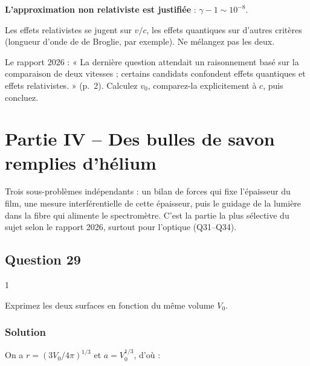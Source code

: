 \documentclass[11pt,a4paper]{article}
\begin{document}
\textbf{L'approximation non relativiste est justifiée} : \(\gamma-1\sim10^{-8}\).

\begin{piege}

Les effets relativistes se jugent sur \(v/c\), les effets quantiques sur d'autres critères (longueur d'onde de de Broglie, par exemple). Ne mélangez pas les deux.

\end{piege}

\begin{jury}

Le rapport 2026 : « La dernière question attendait un raisonnement basé sur la comparaison de deux vitesses ; certains candidats confondent effets quantiques et effets relativistes. » (p.~2). Calculez \(v_0\), comparez-la explicitement à \(c\), puis concluez.

\end{jury}

\hypertarget{partie-iv-des-bulles-de-savon-remplies-dhuxe9lium}{%
\section{Partie IV -- Des bulles de savon remplies d'hélium}\label{partie-iv-des-bulles-de-savon-remplies-dhuxe9lium}}

Trois sous-problèmes indépendants : un bilan de forces qui fixe l'épaisseur du film, une mesure interférentielle de cette épaisseur, puis le guidage de la lumière dans la fibre qui alimente le spectromètre. C'est la partie la plus sélective du sujet selon le rapport 2026, surtout pour l'optique (Q31--Q34).

\hypertarget{question-29}{%
\subsection{Question 29}\label{question-29}}

\begin{indication}{1}

Exprimez les deux surfaces en fonction du même volume \(V_0\).

\end{indication}

\hypertarget{solution-28}{%
\subsubsection{Solution}\label{solution-28}}

On a \(r=(3V_0/4\pi)^{1/3}\) et \(a=V_0^{1/3}\), d'où :
\end{document}
